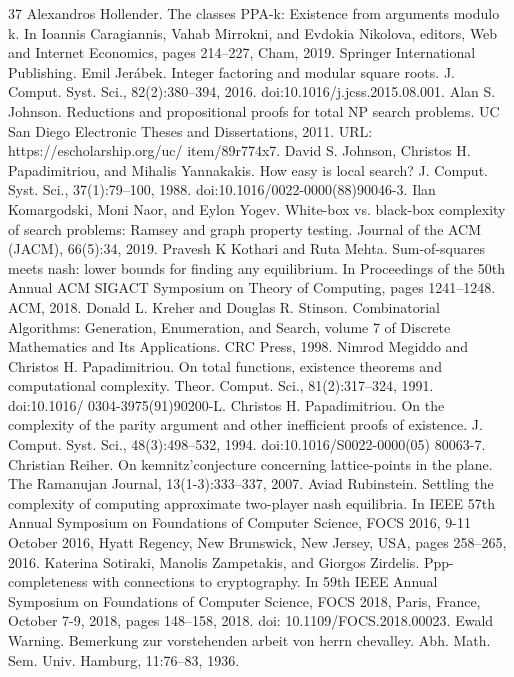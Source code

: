 \documentclass[10pt,a4paper]{article}
\theoremstyle{definition}
\theoremstyle{remark}
\begin{document}
\begin{thebibliography}{37}
 Alexandros Hollender. The classes PPA-k: Existence from arguments modulo k. In Ioannis Caragiannis, Vahab Mirrokni, and Evdokia Nikolova, editors, Web and Internet Economics, pages 214–227, Cham, 2019. Springer International Publishing.
 Emil Jerábek. Integer factoring and modular square roots. J. Comput. Syst. Sci., 82(2):380–394, 2016. doi:10.1016/j.jcss.2015.08.001.
 Alan S. Johnson. Reductions and propositional proofs for total NP search problems. UC San Diego Electronic Theses and Dissertations, 2011. URL: https://escholarship.org/uc/ item/89r774x7.
 David S. Johnson, Christos H. Papadimitriou, and Mihalis Yannakakis. How easy is local search? J. Comput. Syst. Sci., 37(1):79–100, 1988. doi:10.1016/0022-0000(88)90046-3.
 Ilan Komargodski, Moni Naor, and Eylon Yogev. White-box vs. black-box complexity of search problems: Ramsey and graph property testing. Journal of the ACM (JACM), 66(5):34, 2019.
 Pravesh K Kothari and Ruta Mehta. Sum-of-squares meets nash: lower bounds for finding any equilibrium. In Proceedings of the 50th Annual ACM SIGACT Symposium on Theory of Computing, pages 1241–1248. ACM, 2018.
 Donald L. Kreher and Douglas R. Stinson. Combinatorial Algorithms: Generation, Enumeration, and Search, volume 7 of Discrete Mathematics and Its Applications. CRC Press, 1998.
 Nimrod Megiddo and Christos H. Papadimitriou. On total functions, existence theorems and computational complexity. Theor. Comput. Sci., 81(2):317–324, 1991. doi:10.1016/ 0304-3975(91)90200-L.
 Christos H. Papadimitriou. On the complexity of the parity argument and other inefficient proofs of existence. J. Comput. Syst. Sci., 48(3):498–532, 1994. doi:10.1016/S0022-0000(05) 80063-7.
 Christian Reiher. On kemnitz’conjecture concerning lattice-points in the plane. The Ramanujan Journal, 13(1-3):333–337, 2007.
 Aviad Rubinstein. Settling the complexity of computing approximate two-player nash equilibria. In IEEE 57th Annual Symposium on Foundations of Computer Science, FOCS 2016, 9-11 October 2016, Hyatt Regency, New Brunswick, New Jersey, USA, pages 258–265, 2016.
 Katerina Sotiraki, Manolis Zampetakis, and Giorgos Zirdelis. Ppp-completeness with connections to cryptography. In 59th IEEE Annual Symposium on Foundations of Computer Science, FOCS 2018, Paris, France, October 7-9, 2018, pages 148–158, 2018. doi: 10.1109/FOCS.2018.00023.
 Ewald Warning. Bemerkung zur vorstehenden arbeit von herrn chevalley. Abh. Math. Sem. Univ. Hamburg, 11:76–83, 1936.
\end{thebibliography}
\end{document}
